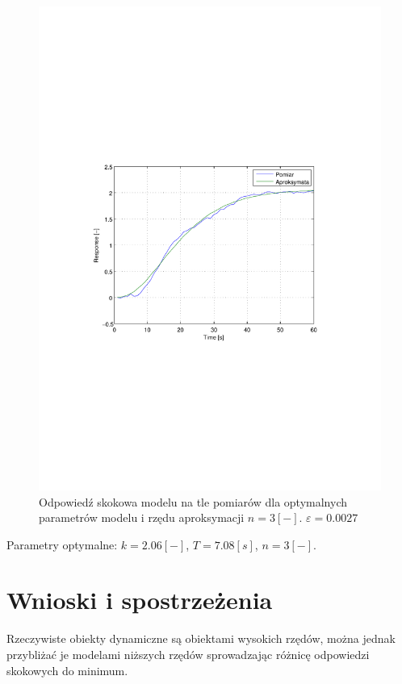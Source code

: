 \documentclass[12pt]{article}
\begin{document}
\begin{figure}[!htb]
	\begin{center}
		\includegraphics[width=14cm,trim=3cm 9cm 3cm 9cm,clip]
		{../res/img/k3_opt_3.pdf}
	\end{center}
	\caption{Odpowiedź skokowa modelu na tle pomiarów dla optymalnych parametrów
	modelu i rzędu aproksymacji $n=3[-]$. $\varepsilon=0.0027$}
\end{figure}

Parametry optymalne: $k=2.06[-]$, $T=7.08[s]$, $n=3[-]$.


\newpage

\section{Wnioski i spostrzeżenia}

Rzeczywiste obiekty dynamiczne są obiektami wysokich rzędów, można jednak
przybliżać je modelami niższych rzędów sprowadzając różnicę odpowiedzi skokowych
do minimum.
\end{document}
